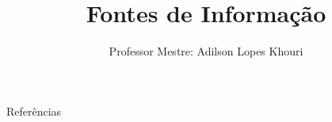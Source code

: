 \documentclass[compress, hyperref={pdfpagelayout=SinglePage}]{beamer}
\title[TCC II - Aula 03]{Fontes de Informação}
\author{Professor Mestre: Adilson Lopes Khouri}
\begin{document}
	
	\begin{frame}
		\titlepage
	\end{frame}
	
	
	
	
	
	
	
	
	
	
			
	\begin{frame}[allowframebreaks]{}
		\begin{block}{Referências}
			\tiny
			\nocite{*}
			
	    		
	    	\end{block}
	\end{frame}
	
\end{document}

